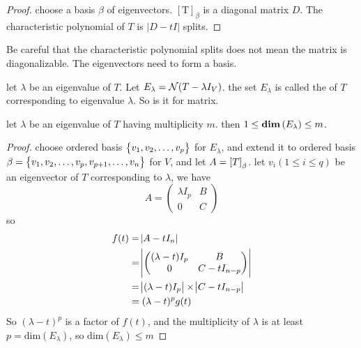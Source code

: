 \begin{proof}
    choose a basis $\beta$ of eigenvectors. $[\mathrm{T}]_\beta$ is a diagonal matrix $D$. The characteristic polynomial of $T$ is $|D - tI|$ splits.
\end{proof}

Be careful that the characteristic polynomial splits does not mean the matrix is diagonalizable. The eigenvectors need to form a basis.


\begin{definition}
    let $\lambda$ be an eigenvalue of $T$. Let $E_\lambda = \mathcal{N}(T - \lambda I_V)$. the set $E_\lambda$ is called the  of $T$ corresponding to eigenvalue $\lambda$. So is it for matrix.
\end{definition}

\begin{theorem}
    let $\lambda$ be an eigenvalue of $T$ having multiplicity $m$. then $1 \leq \displaystyle \mathbf{dim}\left( E_\lambda \right) \leq m$.
\end{theorem}
\begin{proof}
    choose ordered basis $\set{v_1, v_2, \dots, v_p}$ for $E_\lambda$, and extend it to ordered basis $\beta =\set{v_1, v_2, \dots, v_p, v_{p+1}, \dots, v_n}$ for $V$, and let $A = \coordinate{T}_\beta$. let $v_i (1 \leq i \leq q)$ be an eigenvector of $T$ corresponding to $\lambda$, we have
    \begin{equation*}
        A = \begin{pmatrix}
            \lambda I_p & B \\
            0 & C
        \end{pmatrix}
    \end{equation*}
    so \begin{equation*}
        \begin{aligned}
            f(t) &= \abs{A - t I_n} \\
            &= \abs{\begin{pmatrix}
                (\lambda - t) I_p & B \\
                0 & C - t I_{n-p}
            \end{pmatrix}} \\
            &= \abs{(\lambda - t)I_p} \times \abs{C - t I_{n-p}} \\
            &= (\lambda - t)^p g(t)
        \end{aligned}
        \end{equation*}
    So $(\lambda - t)^p$ is a factor of $f(t)$, and the multiplicity of $\lambda$ is at least $p = \text{dim}(E_\lambda)$, so $\text{dim}(E_\lambda) \leq m$ 
\end{proof}

